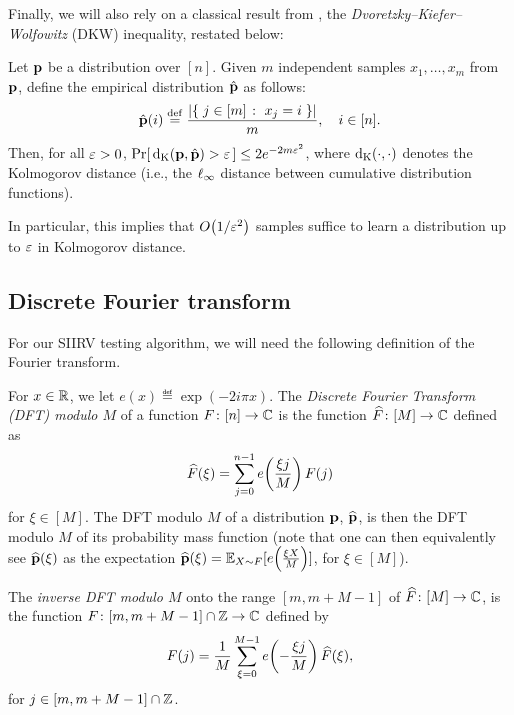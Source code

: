 Finally, we will also rely on a classical result from , the \emph{Dvoretzky--Kiefer--Wolfowitz} (DKW) inequality, restated below:
\begin{theorem}\label{theo:dkw:ineq}
Let $\D$ be a distribution over $[n]$. Given $m$ independent samples $x_1,\dots ,x_m$ from $\D$, define the empirical distribution $\hat{\D}$ as follows:
\[
\hat{\D}(i) \eqdef \frac{\abs{ \setOfSuchThat{j\in[m]}{x_j=i} } }{m}, \quad i\in[n].
\]
Then, for all $\eps > 0$, $\probaOf{ \kolmogorov{\D}{\hat{\D}} > \eps } \leq 2e^{-2m\eps^2}$, where $\kolmogorov{\cdot}{\cdot}$ denotes the Kolmogorov distance (i.e., the $\lp[\infty]$ distance between cumulative distribution functions).
\end{theorem} 
\noindent In particular, this implies that $\bigO{1/\eps^2}$ samples suffice to learn a distribution up to $\eps$ in Kolmogorov distance.

\subsection{Discrete Fourier transform}
For our SIIRV testing algorithm, we will need the following definition of the Fourier transform. 

\begin{definition}
For $x \in \R$, we let $e(x) \eqdef  \exp(-2i\pi x)$. The \emph{Discrete Fourier Transform (DFT) modulo $M$} of a function
$F\colon[n] \to \C$ is  the function $\fourier{F}\colon[M]\to \C$ defined as
\[
    \fourier{F}(\xi)=\sum_{j=0}^{n-1} e\!\left(\frac{\xi j}{M}\right) F(j)
\]
for $\xi \in [M]$. The DFT modulo $M$ of a distribution $\p$, $\fourier{\p}$, is then the DFT modulo $M$ of its probability mass function (note that one can then equivalently see $\fourier{\p}(\xi)$ as the expectation $\fourier{\p}(\xi) = \shortexpect_{X\sim F}[e\!\left(\frac{\xi X}{M}\right)]$, for $\xi\in[M]$).

The \emph{inverse DFT modulo $M$} onto the range $[m,m+M-1]$ of $\fourier{F}\colon [M] \to \C$, is the function $F\colon [m, m+M-1] \cap \Z \to \C$ defined by 
\[
    F(j)= \frac{1}{M} \sum_{\xi=0}^{M-1} e\!\left(-\frac{\xi j}{M}\right) \fourier{F}(\xi),
\]
for $j \in [m, m+M-1] \cap \Z$.
\end{definition}

